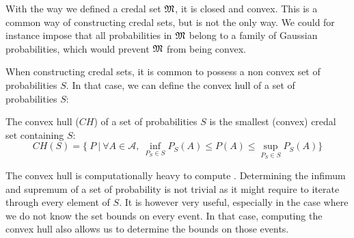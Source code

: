 \begin{remark}
    With the way we defined a credal set $\mathfrak{M}$, it is closed and convex. This is a common way of constructing credal sets, but is not the only way. We could for instance impose that all probabilities in $\mathfrak{M}$ belong to a family of Gaussian probabilities, which would prevent $\mathfrak{M}$ from being convex.
\end{remark}

When constructing credal sets, it is common to possess a non convex set of probabilities $S$. In that case, we can define the convex hull of a set of probabilities $S$:
\begin{definition}\label{def:convex_hull}
    The convex hull ($CH$) of a set of probabilities $S$ is the smallest (convex) credal set containing $S$:
    \begin{equation}
        CH(S) = \{~P~|~\forall A\in\mathcal{A}, ~\inf_{P_S\in S}P_S(A)\leqslant P(A) \leqslant \sup_{P_S\in S}P_S(A)\}
    \end{equation}
\end{definition}

\begin{remark}
    The convex hull is computationally heavy to compute . Determining the infimum and supremum of a set of probability is not trivial as it might require to iterate through every element of $S$. It is however very useful, especially in the case where we do not know the set bounds on every event. In that case, computing the convex hull also allows us to determine the bounds on those events.
\end{remark}

